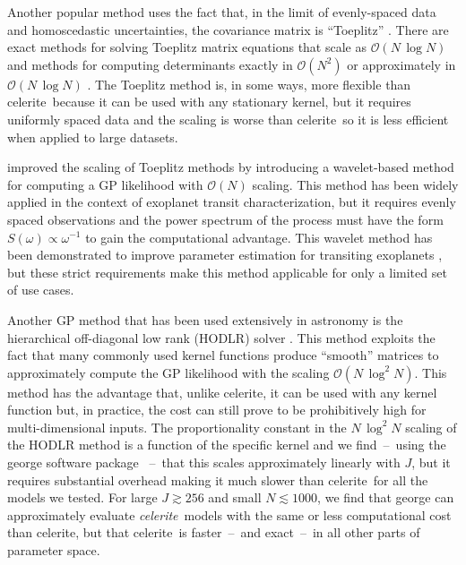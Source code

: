 \documentclass[manuscript, letterpaper]{aastex6}
\newcommand{\project}[1]{\textsf{#1}}
\newcommand{\celerite}{\project{celerite}}
\newcommand{\celeriteterm}{\emph{celerite}}
\begin{document}
Another popular method uses the fact that, in the limit of evenly-spaced data
and homoscedastic uncertainties, the covariance matrix is ``Toeplitz''
\citep[for example][]{Dillon:2013}.
There are exact methods for solving Toeplitz matrix equations that scale as
$\mathcal{O}(N\,\log N)$ and methods for computing determinants exactly in
$\mathcal{O}(N^2)$ or approximately in $\mathcal{O}(N\,\log N)$
\citep{Wilson:2014}.
The Toeplitz method is, in some ways, more flexible than \celerite\ because it
can be used with any stationary kernel, but it requires uniformly spaced data
and the scaling is worse than \celerite\ so it is less efficient when applied
to large datasets.

\citet{Carter:2009} improved the scaling of Toeplitz methods by introducing a
wavelet-based method for computing a GP likelihood with $\mathcal{O}(N)$
scaling.
This method has been widely applied in the context of exoplanet transit
characterization, but it requires evenly spaced observations and the power
spectrum of the process must have the form $S(\omega)\propto \omega^{-1}$ to
gain the computational advantage.
This wavelet method has been demonstrated to improve parameter estimation for
transiting exoplanets \citep{Carter:2009}, but these strict requirements make
this method applicable for only a limited set of use cases.

Another GP method that has been used extensively in astronomy is the
hierarchical off-diagonal low rank (HODLR) solver \citep{Ambikasaran:2016}.
This method exploits the fact that many commonly used kernel functions produce
``smooth'' matrices to approximately compute the GP likelihood with the
scaling $\mathcal{O}(N\,\log^2 N)$.
This method has the advantage that, unlike \celerite, it can be used with any
kernel function but, in practice, the cost can still prove to be prohibitively
high for multi-dimensional inputs.
The proportionality constant in the $N\,\log^2N$ scaling of the HODLR method
is a function of the specific kernel and we find~--~using the \project{george}
software package \citep{Foreman-Mackey:2014, Ambikasaran:2016}~--~that this
scales approximately linearly with $J$, but it requires substantial overhead
making it much slower than \celerite\ for all the models we tested.
For large $J \gtrsim 256$ and small $N \lesssim 1000$, we find that
\project{george} can approximately evaluate \celeriteterm\ models with the
same or less computational cost than \celerite, but that \celerite\ is
faster~--~and exact~--~in all other parts of parameter space.
\end{document}
